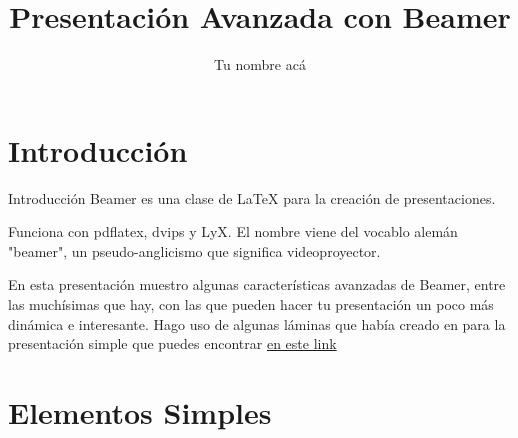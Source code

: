 \documentclass[a4paper,10pt]{beamer}
\begin{document}
\begin{frame}
\title{Presentaci\'on Avanzada con Beamer}
\author{Tu nombre ac\'a}
\date{}
\maketitle
\end{frame}

\section[\'Indice]{}

\section{Introducci\'on}
\begin{frame}{Introducci\'on}
\justify
Beamer es una clase de LaTeX para la creaci\'on de
presentaciones.

\vspace{0.3cm}
\begin{justify}
Funciona con pdflatex, dvips y LyX. El nombre 
viene del vocablo alem\'an "beamer", un pseudo-anglicismo 
que significa videoproyector. 

\vspace{0.3cm}

En esta presentaci\'on muestro algunas caracter\'isticas avanzadas
de Beamer, entre las much\'isimas que hay, con las que pueden
hacer tu presentaci\'on un poco m\'as din\'amica e interesante.
Hago uso de algunas l\'aminas que hab\'ia creado en para la 
presentaci\'on simple que puedes encontrar \href{https://github.com/FavioVazquez/Presentacion\_Beamer\_Simple}{\color{blue} en este link}
\end{justify}
\end{frame}

\section{Elementos Simples}
\end{document}
